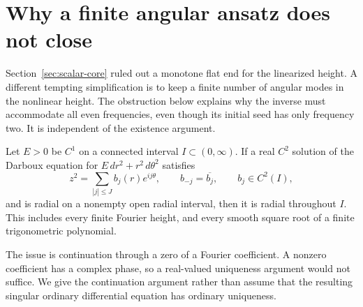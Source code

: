 \section{Why a finite angular ansatz does not close}
\label{app:app-obstructions}

Section~\ref{sec:scalar-core} ruled out a monotone flat end for the
linearized height. A different tempting simplification is to keep a
finite number of angular modes in the nonlinear height. The
obstruction below explains why the inverse must accommodate all even
frequencies, even though its initial seed has only frequency two.
It is independent of the existence argument.

\begin{proposition}\label{prop:obs-finite-square}
Let $E>0$ be $C^1$ on a connected interval $I\subset(0,\infty)$.
If a real $C^2$ solution of the Darboux equation for
$E\,dr^2+r^2\,d\theta^2$ satisfies
\[
 z^2=\sum_{|j|\le J}b_j(r)e^{ij\theta},\qquad
 b_{-j}=\overline{b_j},\qquad b_j\in C^2(I),
\]
and is radial on a nonempty open radial interval, then it is radial
throughout $I$. This includes every finite Fourier height, and every
smooth square root of a finite trigonometric polynomial.
\end{proposition}

The issue is continuation through a zero of a Fourier coefficient.
A nonzero coefficient has a complex phase, so a real-valued
uniqueness argument would not suffice. We give the continuation
argument rather than assume that the resulting singular ordinary
differential equation has ordinary uniqueness.

